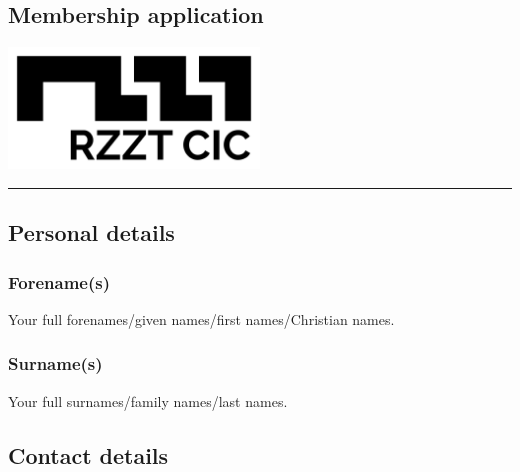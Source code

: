 \documentclass[a4paper,10pt]{article}
\begin{document}
\thispagestyle{firstpage}

\begin{Form}

\begin{minipage}[b]{0.5\textwidth}
  \section{Membership application}
\end{minipage}
%
\begin{minipage}[b]{0.5\textwidth}
  \raggedleft
  \includegraphics[width=0.5\textwidth]{logo-black.jpg}
\end{minipage}

\hrule

\vspace{2em}

\subsection{Personal details}

\subsubsection{Forename(s)}

Your full forenames/given names/first names/Christian names.

\begin{framed}%
  \TextField[width=\textwidth,maxlen=75,donotscroll=true,name=forename]{ }%
\end{framed}%

\subsubsection{Surname(s)}

Your full surnames/family names/last names.

\begin{framed}%
  \TextField[width=\textwidth,donotscroll=true,name=surname]{ }%
\end{framed}%

\subsection{Contact details}


\end{Form}
\end{document}
